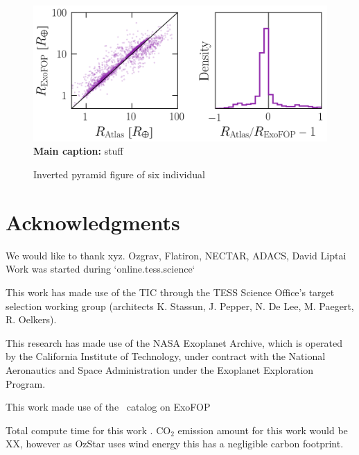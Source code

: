 \documentclass[floatfix,ApJL,twocolumn]{aastex631}
\begin{document}
\begin{figure}
  \includegraphics[width=\linewidth]{figures/radius_error.png}
  \caption{\textbf{Main caption:} stuff }
  \label{fig:}
\end{figure}

\begin{figure}
    \caption{Inverted pyramid figure of six individual }
    \label{fig:}
\end{figure}




\section*{Acknowledgments}{

We would like to thank xyz.
Ozgrav, Flatiron, NECTAR, ADACS, David Liptai
Work was started during `online.tess.science`

This work has made use of the TIC through the TESS Science Office’s target selection working group (architects K. Stassun, J. Pepper, N. De Lee, M. Paegert, R. Oelkers).

This research has made use of the NASA Exoplanet Archive, which is operated by the California Institute of Technology, under contract with the National Aeronautics and Space Administration under the Exoplanet Exploration Program.

This work made use of the \tess\ catalog on ExoFOP

Total compute time for this work \red{\cpuHrs} . CO$_2$ emission amount for this work would be XX, however as OzStar uses wind energy this has a negligible carbon footprint.

}

\vspace{5mm}
\end{document}
